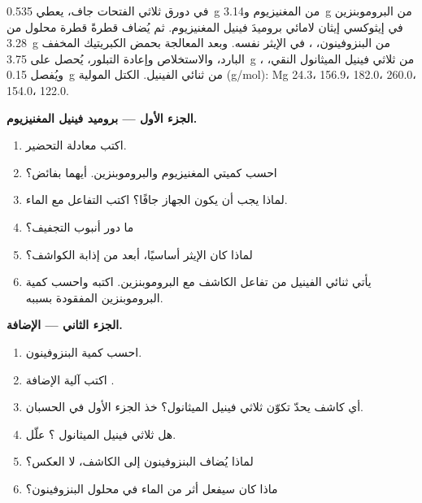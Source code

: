 \begin{problem}
\label{pb:b1:organomagnesium:1}
في دورق ثلاثي الفتحات جاف، يعطي \qty{0.535}{g} من المغنيزيوم
و\qty{3.14}{g} من البروموبنزين في إيثوكسي إيثان لامائي
بروميدَ فينيل المغنيزيوم. ثم يُضاف قطرةً قطرة محلول من \qty{3.28}{g} من البنزوفينون،
، في الإيثر نفسه. وبعد المعالجة
بحمض الكبريتيك المخفف البارد، والاستخلاص وإعادة التبلور،
يُحصل على \qty{3.75}{g} من ثلاثي فينيل الميثانول النقي، ،
ويُفصل \qty{0.15}{g} من ثنائي الفينيل. الكتل المولية (\unit{g/mol}):
Mg 24.3،  156.9،  182.0،  260.0،
 154.0،  122.0.

\medskip
\noindent\textbf{الجزء الأول --- بروميد فينيل المغنيزيوم.}
\begin{enumerate}
  \item اكتب معادلة التحضير.
  \item احسب كميتي المغنيزيوم والبروموبنزين. أيهما
        بفائض؟
  \item لماذا يجب أن يكون الجهاز جافًا؟ اكتب التفاعل مع الماء.
  \item ما دور أنبوب التجفيف؟
  \item لماذا كان الإيثر أساسيًا، أبعد من إذابة الكواشف؟
  \item يأتي ثنائي الفينيل من تفاعل الكاشف مع البروموبنزين.
        اكتبه واحسب كمية البروموبنزين المفقودة بسببه.
\end{enumerate}

\medskip
\noindent\textbf{الجزء الثاني --- الإضافة.}
\begin{enumerate}[resume]
  \item احسب كمية البنزوفينون.
  \item اكتب آلية الإضافة .
  \item أي كاشف يحدّ تكوّن ثلاثي فينيل الميثانول؟ خذ
        الجزء الأول في الحسبان.
  \item هل ثلاثي فينيل الميثانول ؟ علّل.
  \item لماذا يُضاف البنزوفينون إلى الكاشف، لا العكس؟
  \item ماذا كان سيفعل أثر من الماء في محلول البنزوفينون؟
\end{enumerate}


\end{problem}
